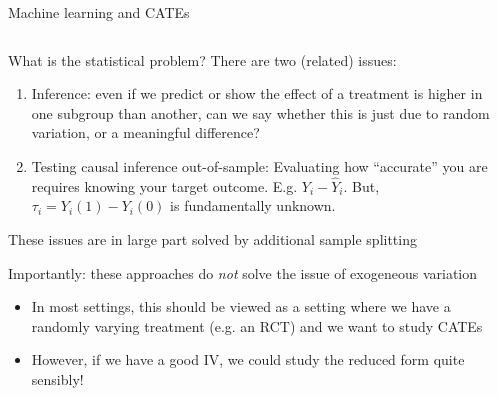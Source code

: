 \documentclass[notes,11pt, aspectratio=169]{beamer}
\newenvironment{wideitemize}{\itemize\addtolength{\itemsep}{10pt}}{\enditemize}
\begin{document}
\begin{frame}{Machine learning and CATEs}
    \begin{columns}[onlytextwidth, T] %
      \begin{column}{.9\textwidth}
        \begin{wideitemize}
        \item What is the statistical problem? There are two (related) issues:
          \begin{enumerate}
          \item Inference: even if we predict or show the effect of a
            treatment is higher in one subgroup than another, can we
            say whether this is just due to random variation, or a
            meaningful difference?
          \item Testing causal inference out-of-sample: Evaluating how
            ``accurate'' you are requires knowing your target
            outcome. E.g. $Y_{i} - \hat{Y}_{i}$. But,
            $\tau_{i} = Y_{i}(1) - Y_{i}(0)$ is fundamentally unknown. 
          \end{enumerate}
        \item These issues are in large part solved by additional
          sample splitting
        \item Importantly: these approaches do \emph{not} solve the
          issue of exogeneous variation
          \begin{itemize}
          \item In most settings, this should be viewed as a setting
            where we have a randomly varying treatment (e.g. an RCT)
            and we want to study CATEs
          \item However, if we have a good IV, we could study the
            reduced form quite sensibly!
          \end{itemize}
        \end{wideitemize}
      \end{column}%
      \hfill%
      \begin{column}{.5\textwidth}
      \end{column}%
    \end{columns}
\end{frame}
\end{document}
